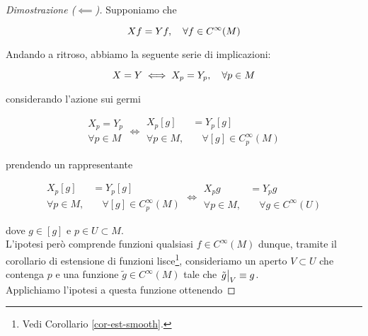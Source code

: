 \begin{proof}[Dimostrazione ($ \impliedby $)]
	Supponiamo che
	
	\begin{equation}
		X f = Y f  \qcomma \forall f \in C^{\infty}(M)
	\end{equation}
	
	Andando a ritroso, abbiamo la seguente serie di implicazioni:
	
	\begin{equation}
		X = Y \iff X_{p} = Y_{p} \qcomma \forall p \in M
	\end{equation}

	considerando l'azione sui germi
	
	\begin{equation}
		\begin{aligned}
			X_{p} = Y_{p} \\
			\forall p \in M
		\end{aligned} %
		 \iff %
		 \begin{aligned}
			 X_{p} [g] &= Y_{p} [g] \\
			 \forall p \in M,& \quad \forall [g] \in C_{p}^{\infty}(M)
		 \end{aligned}
	\end{equation}

	prendendo un rappresentante
	
	\begin{equation}
		\begin{aligned}
			X_{p} [g] &= Y_{p} [g] \\
			\forall p \in M,& \quad \forall [g] \in C_{p}^{\infty}(M)
		\end{aligned}%
		\iff %
		\begin{aligned}
			X_{p} g &= Y_{p} g \\
			\forall p \in M,& \quad \forall g \in C^{\infty}(U)
		\end{aligned}
	\end{equation}
	
	dove $ g \in [g] $ e $ p \in U \subset M $.\\
	L'ipotesi però comprende funzioni qualsiasi $ f \in C^{\infty}(M) $ dunque, tramite il corollario di estensione di funzioni lisce\footnote{%
		Vedi Corollario \ref{cor-est-smooth}.%
	}, consideriamo un aperto $ V \subset U $ che contenga $ p $ e una funzione $ \tilde{g} \in C^{\infty}(M) $ tale che $ \eval{\tilde{g}}_{V} \equiv g $.\\
	Applichiamo l'ipotesi a questa funzione ottenendo
	

\end{proof}
